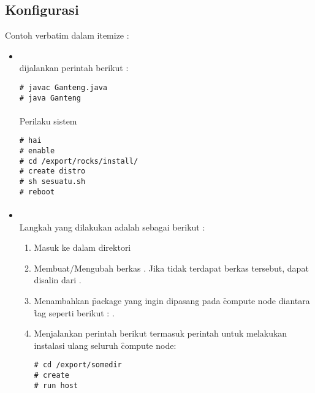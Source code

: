 \subsection{Konfigurasi}\label{cha:confcluster}
Contoh verbatim dalam itemize : 
\begin{itemize}
\item {}\\
dijalankan perintah berikut : 
\begin{Verbatim}[frame=single]
# javac Ganteng.java
# java Ganteng
\end{Verbatim}
\paragraph{}
Perilaku sistem 
\begin{Verbatim}[frame=single]
# hai
# enable
# cd /export/rocks/install/
# create distro
# sh sesuatu.sh
# reboot
\end{Verbatim}
\paragraph{}

\item {}\\
Langkah yang dilakukan adalah sebagai berikut : 
	\begin{enumerate}
	\item Masuk ke dalam direktori 
	\item Membuat/Mengubah berkas . Jika tidak terdapat berkas tersebut, dapat disalin dari .
	\item Menambahkan \f{package} yang ingin dipasang pada \f{compute node} diantara \f{tag}  seperti berikut : .
	\item Menjalankan perintah berikut termasuk perintah untuk melakukan instalasi ulang seluruh \f{compute node}: 
	\begin{Verbatim}[frame=single]
# cd /export/somedir
# create
# run host
	\end{Verbatim}
	\end{enumerate}
	\paragraph{}
\end{itemize}

